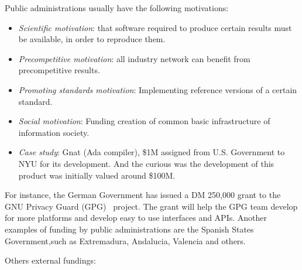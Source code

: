 		Public administrations usually have the following motivations:
			\begin{itemize}		
				\item \emph{Scientific motivation}: that software required to produce certain results must be available, in order to reproduce them.
				\item \emph{Precompetitive motivation}: all industry network can benefit from precompetitive results. 
				\item \emph{Promoting standards motivation}: Implementing reference versions of a certain standard.
				
				\item \emph{Social motivation}: Funding creation of common basic infrastructure of information society. 
				
				\item \emph{Case study}: Gnat (Ada compiler), \$1M assigned from U.S. Government to NYU for its development. And the curious was the development of this product was initially valued around \$100M.
			\end{itemize}
							
			For instance, the German Government has issued a DM 250,000 grant to the GNU Privacy Guard (GPG)~\cite{GPG} project. The grant will help the GPG team develop for more platforms and develop easy to use interfaces and APIs. Another examples of funding by public administrations are the Spanish States Government,such as Extremadura, Andalucia, Valencia and others.
			
			Others external fundings: 			
			

